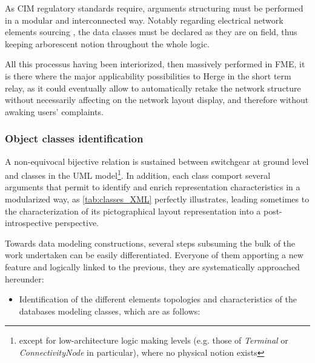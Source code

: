 As CIM regulatory standards \cite{IEC_CIM_static, IEC_CIM_convention} require, arguments structuring must be performed in a modular and interconnected way. Notably regarding electrical network elements sourcing \cite{IEC_xml-rdf}, the data classes must be declared as they are on field, thus keeping arborescent notion throughout the whole logic.

All this processus having been interiorized, then massively performed in FME, it is there where the major applicability possibilities to Herge in the short term relay, as it could eventually allow to automatically retake the network structure without necessarily affecting on the network layout display, and therefore without awaking users' complaints.

\subsubsection{Object classes identification}
\label{sec:intro:AIG:structurisation:classes}

A non-equivocal bijective relation is sustained between switchgear at ground level and classes in the UML model\footnote{except for low-architecture logic making levels (e.g. those of \textit{Terminal} or \textit{ConnectivityNode} in particular), where no physical notion exists}. In addition, each class comport several arguments that permit to identify and enrich representation characteristics in a modularized way, as \ref{tab:classes_XML} perfectly illustrates, leading sometimes to the characterization of its pictographical layout representation into a post-introspective perspective.

Towards data modeling constructions, several steps subsuming the bulk of the work undertaken can be easily differentiated. Everyone of them apporting a new feature and logically linked to the previous, they are systematically approached hereunder: 

\begin{itemize}

\item Identification of the different elements topologies and characteristics of the databases modeling classes, which are as follows:
\end{itemize}


